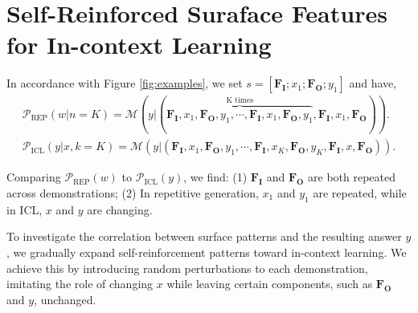 \documentclass{article} %
\def\elliott#1{{\color{cyan}{\bf [Elliott:} {{#1}}{\bf ]}}}
\def\chenming#1{{\color{red}{\bf [Chenming:} {{#1}}{\bf ]}}}
\begin{document}
\section{Self-Reinforced Suraface Features for In-context Learning}


In accordance with Figure \ref{fig:examples}, we set $s=[\mathbf{F_I}; x_1; \mathbf{F_O}; y_1]$ and have,
\begin{gather*}
  \mathcal{P}_{\text{REP}}(w|n=K) = \mathcal{M}(y|(\overbrace{\mathbf{F_I}, x_1, \mathbf{F_O}, y_1, \cdots, 
  \mathbf{F_I}, x_1, \mathbf{F_O}, y_1}^{\text{K times}}, \mathbf{F_I}, x_1, \mathbf{F_O})). \\
  \mathcal{P}_{\text{ICL}}(y|x,k=K) = \mathcal{M}(y|(\mathbf{F_I}, x_1, \mathbf{F_O}, y_1, \cdots, \mathbf{F_I}, x_K, \mathbf{F_O}, y_K, \mathbf{F_I}, x, \mathbf{F_O})).
  \label{eq:rep}
\end{gather*}

Comparing $\mathcal{P}_{\text{REP}}(w)$ to $\mathcal{P}_{\text{ICL}}(y)$, we find: (1) $\mathbf{F_I}$ and $\mathbf{F_O}$ are both repeated across demonstrations; (2) In repetitive generation, $x_1$ and $y_1$ are repeated, while in ICL, $x$ and $y$ are changing. 

To investigate the correlation between surface patterns and the resulting answer $y$, we gradually expand self-reinforcement patterns toward in-context learning.
We achieve this by introducing random perturbations to each demonstration, imitating the role of changing $x$ while leaving certain components, such as $\mathbf{F_O}$ and $y$, unchanged.
\end{document}
